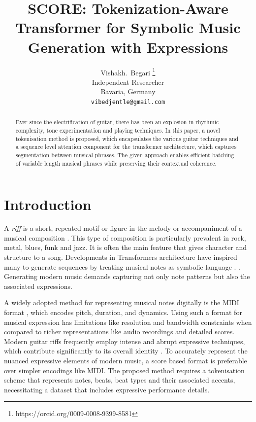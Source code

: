 \documentclass{article} %
\title{SCORE: Tokenization-Aware Transformer for Symbolic Music Generation with Expressions}
\author{Vishakh.~Begari \thanks{https://orcid.org/0009-0008-9399-8581} \\
Independent Researcher\\
Bavaria, Germany \\
\texttt{vibedjentle@gmail.com}
}
\begin{document}
\maketitle

\begin{abstract}
Ever since the electrification of guitar, there has been an explosion in rhythmic complexity,
tone experimentation and playing techniques. In this paper, a novel tokenisation method is proposed,
which encapsulates the various guitar techniques and a sequence level attention component 
for the transformer architecture, 
which captures segmentation between musical phrases. The given approach enables 
efficient batching of variable length musical phrases while preserving their contextual coherence.
\end{abstract}

\section{Introduction}\label{sec1}

A \textit{riff} is a short, repeated motif or figure in the melody or accompaniment of a 
musical composition \citep{randel86}. This type of composition is particularly prevalent 
in rock, metal, blues, funk and jazz. It is often the main feature that gives character 
and structure to a song. Developments in Transformers architecture have inspired 
many to generate sequences by treating musical notes as symbolic language
\citep{Vaswani2}
\citep{10.1145/3394171.3413671}
\citep{wu2020jazz}
\citep{ens2020mmm}
\citep{symbolic}
\citep{yu2022museformer}. 
\citep{dong2023multitrack}
\citep{app13074543}
\citep{agostinelli2023musiclmgeneratingmusictext} 
\citep{copet2024simplecontrollablemusicgeneration} 
\citep{doi:10.1177/14727978251337904}.
Generating modern music demands capturing not only note patterns but also the associated expressions. 

A widely adopted method for representing musical notes digitally is the MIDI format \citep{craig2025midifileformat}, 
which encodes pitch, duration, and dynamics. Using such a format for musical expression has limitations like resolution 
and bandwidth constraints \citep{midi_short} when compared to richer representations like 
audio recordings and detailed scores. Modern guitar riffs frequently employ intense and abrupt expressive
techniques, which contribute significantly to its overall identity \citep{vallejo2021development}. To accurately represent the nuanced 
expressive elements of modern music, a score based format is preferable over simpler encodings like MIDI.
The proposed method requires a tokenisation scheme that represents notes, beats, beat types and their associated accents, 
necessitating a dataset that includes expressive performance details.
\end{document}
